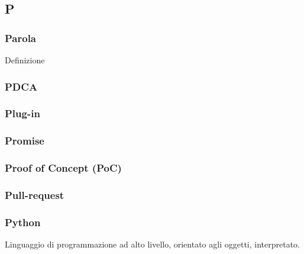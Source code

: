 \subsection*{\textbf{\hfill \Huge{P} \hfill}} 
\subsubsection*{Parola}
Definizione
\subsubsection*{PDCA}

\subsubsection*{Plug-in}

\subsubsection*{Promise}

\subsubsection*{Proof of Concept (PoC)}

\subsubsection*{Pull-request}

\subsubsection*{Python}
Linguaggio di programmazione ad alto livello, orientato agli oggetti, interpretato.
